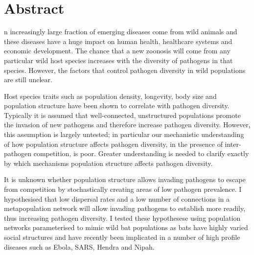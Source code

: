 










\section{Abstract}


n increasingly large fraction of emerging diseases come from wild animals and these diseases have a huge impact on human health, healthcare systems and economic development.
The chance that a new zoonosis will come from any particular wild host species increases with the diversity of pathogens in that species.
However, the factors that control pathogen diversity in wild populations are still unclear.




Host species traits such as population density, longevity, body size and population structure have been shown to correlate with pathogen diversity.
Typically it is assumed that well-connected, unstructured populations promote the invasion of new pathogens and therefore increase pathogen diversity. %
However, this assumption is largely untested; in particular our mechanistic understanding of how population structure affects pathogen diversity, in the presence of inter-pathogen competition, is poor.
Greater understanding is needed to clarify exactly by which mechanisms population structure affects pathogen diversity. 



It is unknown whether population structure allows invading pathogens to escape from competition by stochastically creating areas of low pathogen prevalence.
I hypothesised that low dispersal rates and a low number of connections in a metapopulation network will allow invading pathogens to establish more readily, thus increasing pathogen diversity. 
I tested these hypothesese using population networks parameterised to mimic wild bat populations as bats have highly varied social structures and have recently been implicated in a number of high profile diseases such as Ebola, SARS, Hendra and Nipah.

